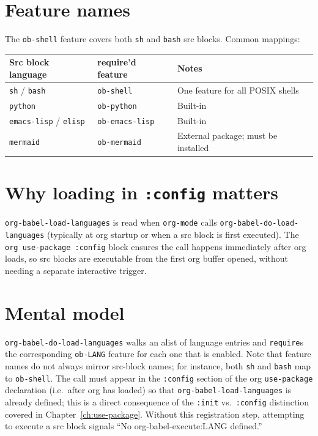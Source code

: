 \section{Feature names}\label{feature-names}

The \texttt{ob-shell} feature covers both \texttt{sh} and \texttt{bash} src blocks. Common mappings:

\begin{longtable}[]{@{}lll@{}}
\toprule
Src block language & require'd feature & Notes \\
\midrule
\texttt{sh} / \texttt{bash} & \texttt{ob-shell} & One feature for all POSIX shells \\
\texttt{python} & \texttt{ob-python} & Built-in \\
\texttt{emacs-lisp} / \texttt{elisp} & \texttt{ob-emacs-lisp} & Built-in \\
\texttt{mermaid} & \texttt{ob-mermaid} & External package; must be installed \\
\bottomrule
\end{longtable}

\section{Why loading in \texttt{:config} matters}\label{why-loading-in-config-matters}

\texttt{org-babel-load-languages} is read when \texttt{org-mode} calls \texttt{org-babel-do-load-languages} (typically at org startup or when a src block is first executed). The \texttt{org use-package :config} block ensures the call happens immediately after org loads, so src blocks are executable from the first org buffer opened, without needing a separate interactive trigger.

\section{Mental model}
\texttt{org-babel-do-load-languages} walks an alist of language entries and
\texttt{require}s the corresponding \texttt{ob-LANG} feature for each one
that is enabled.  Note that feature names do not always mirror src-block
names; for instance, both \texttt{sh} and \texttt{bash} map to
\texttt{ob-shell}.  The call must appear in the \texttt{:config} section of
the org \texttt{use-package} declaration (i.e.\ after org has loaded) so that
\texttt{org-babel-load-languages} is already defined; this is a direct
consequence of the \texttt{:init} vs.\ \texttt{:config} distinction covered
in Chapter~\ref{ch:use-package}.  Without this registration step, attempting
to execute a src block signals ``No org-babel-execute:LANG defined.''
